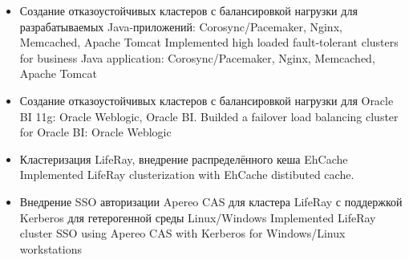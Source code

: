 \documentclass[11pt,a4paper,sans, russian]{moderncv}        %
\begin{document}
{\begin{itemize}
\begin{itemize}
			\item {}
				{Создание отказоустойчивых кластеров с балансировкой нагрузки для разрабатываемых Java-приложений: Corosync/Pacemaker, Nginx, Memcached, Apache Tomcat}
				{Implemented high loaded fault-tolerant clusters for business Java application: Corosync/Pacemaker, Nginx, Memcached, Apache Tomcat}
			\item {}
				{Создание отказоустойчивых кластеров с балансировкой нагрузки для Oracle BI 11g: Oracle Weblogic, Oracle BI.}
				{Builded a failover load balancing cluster for Oracle BI: Oracle Weblogic}
			\item {}
				{Кластеризация LifeRay, внедрение распределённого кеша EhCache}
				{Implemented LifeRay clusterization with EhCache distibuted cache.}
			\item {}
				{Внедрение SSO авторизации Apereo CAS для кластера LifeRay с поддержкой Kerberos для гетерогенной среды Linux/Windows}
				{Implemented LifeRay cluster SSO using Apereo CAS with Kerberos for Windows/Linux workstations}
		\end{itemize}
	\end{itemize}
}

\newpage

%
%
\end{document}
